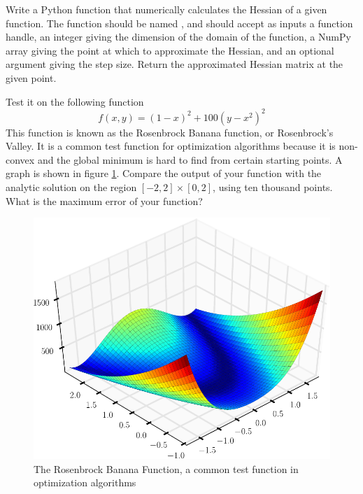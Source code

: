 \begin{problem}
Write a Python function that numerically calculates the Hessian of a given function. 
The function should be named , and should accept as inputs a function handle, 
an integer giving the dimension of the domain of the function, a NumPy 
array giving the point at which to approximate the Hessian, and an optional argument giving the 
step size.
Return the approximated Hessian matrix at the given point.

Test it on the following function
\begin{equation*}
f(x,y) = (1-x)^2 + 100(y-x^2)^2
\end{equation*}
This function is known as the Rosenbrock Banana function, or Rosenbrock's Valley. It is a common test function for optimization algorithms because it is non-convex and the global minimum is hard to find from certain starting points. A graph is shown in figure \ref{Fig:Rosenbrock}. Compare the output of your function with the analytic solution on the region $[-2,2] \times [0,2]$, using ten thousand points. What is the maximum error of your function?
\end{problem}
\begin{figure}
\begin{center}
\includegraphics[width = \textwidth]{Rosenbrock}
\caption{The Rosenbrock Banana Function, a common test function in optimization algorithms}
\label{Fig:Rosenbrock}
\end{center}
\end{figure}

